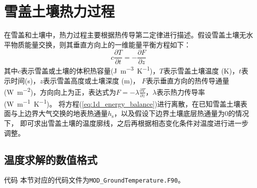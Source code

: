 \chapter{雪盖土壤热力过程}


在雪盖和土壤中，热力过程主要根据热传导第二定律进行描述。假设雪盖土壤无水平物质能量交换，则其垂直方向上的一维能量平衡方程如下：
\begin{equation}\label{eq:1d_energy_balance}
  c \frac{\partial T}{\partial t}=-\frac{\partial F}{\partial z}
\end{equation}
其中$c$表示雪盖或土壤的体积热容量(\unit{J.m^{-3}.K^{-1}})，$T$表示雪盖土壤温度 (K)，$t$表示时间(s)，$z$表示雪盖高度或土壤深度 (m)，
$F$表示垂直方向的热传导通量(\unit{W.m^{-2}})，方向向上为正，表达式为$F=-\lambda\frac{\partial T}{\partial z}$，$\lambda$表示热力传导率(\unit{W.m^{-1}.K^{-1}})。
将方程(\ref{eq:1d_energy_balance})进行离散，在已知雪盖土壤表面与上边界大气交换的地表热通量$h_{\mathrm {s}} $，以及假设下边界土壤底层热通量为0的情况下，
即可求出雪盖土壤的温度廓线，之后再根据相态变化条件对温度进行进一步调整。


\section{温度求解的数值格式}\label{温度求解的数值格式}

\begin{mymdframed}{代码}
  本节对应的代码文件为\texttt{MOD\_GroundTemperature.F90}。
\end{mymdframed}

